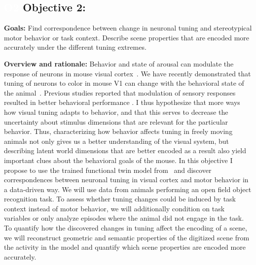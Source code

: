 \documentclass[B2,COG]{ercgrant}
\begin{document}
\subsection{\colorbox{obj2}{\textcolor{white}{O2}} Objective 2: \otwotitle}


\textbf{Goals:} Find correspondence between change in neuronal tuning and stereotypical motor behavior or task context.
Describe scene properties that are encoded more accurately under the different tuning extremes. 

\textbf{Overview and rationale:} 
Behavior and state of arousal can modulate the response of neurons in mouse visual cortex~\parencite{Niell2010-bs, Stringer2019-lt, Musall2019-kd}.
We have recently demonstrated that tuning of neurons to color in mouse V1 can change with the behavioral state of the animal~\parencite{Franke2022-do}.
Previous studies reported that modulation of sensory responses resulted in better behavioral performance \parencite{Spitzer1988-kq, Bennett2013-rk, Dadarlat2017-jw, De_Gee2022-ir}.
I thus hypothesize that more ways how visual tuning adapts to behavior, and that this serves to decrease the uncertainty about stimulus dimensions that are relevant for the particular behavior. 
Thus, characterizing how behavior affects tuning in freely moving animals not only gives us a better understanding of the visual system, but describing latent world dimensions that are better encoded as a result also yield important clues about the behavioral goals of the mouse. 
In this objective I propose to use the trained functional twin model from~ and discover correspondences between neuronal tuning in visual cortex and motor behavior in a data-driven way. 
We will use data from animals performing an open field object recognition task. 
To assess whether tuning changes could be induced by task context instead of motor behavior, we will additionally condition on task variables or only analyze episodes where the animal did not engage in the task. 
To quantify how the discovered changes in tuning affect the encoding of a scene, we will reconstruct geometric and semantic properties of the digitized scene from the activity in the model and quantify which scene properties are encoded more accurately. 
\end{document}
